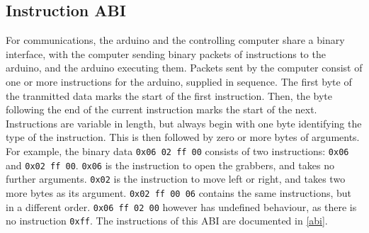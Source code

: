\subsection{Instruction ABI}

For communications, the arduino and the controlling computer share a binary
interface, with the computer sending binary packets of instructions to the
arduino, and the arduino executing them. Packets sent by the computer consist
of one or more instructions for the arduino, supplied in sequence. The first
byte of the tranmitted data marks the start of the first instruction. Then, the
byte following the end of the current instruction marks the start of the next.
Instructions are variable in length, but always begin with one byte identifying
the type of the instruction. This is then followed by zero or more bytes of
arguments. For example, the binary data \texttt{0x06 02 ff 00} consists of two
instructions: \texttt{0x06} and \texttt{0x02 ff 00}. \texttt{0x06} is the
instruction to open the grabbers, and takes no further arguments. \texttt{0x02}
is the instruction to move left or right, and takes two more bytes as its
argument. \texttt{0x02 ff 00 06} contains the same instructions, but in a
different order. \texttt{0x06 ff 02 00} however has undefined behaviour, as
there is no instruction \texttt{0xff}. The instructions of this ABI are
documented in \cref{abi}.
